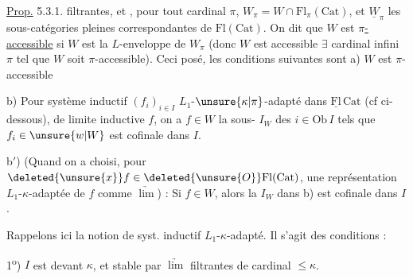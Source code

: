 \uline{Prop.} 5.3.1.   filtrantes, et , pour  tout cardinal  $\pi$,
$W_\pi=W\cap\mathrm{Fl}_{\pi}(\mathrm{Cat})$, et  $\underline W_\pi$ les sous-catégories  pleines correspondantes de $\mathrm{Fl}(\mathrm{Cat})$. On dit que $W$ est \uline{$\pi$-accessible} si $W$ est la $L$-enveloppe de $W_\pi$ (donc $W$ est accessible  $\exists$ cardinal infini $\pi$ tel que $W$ soit $\pi$-accessible). Ceci posé, les conditions suivantes sont 
a) $W$ est  $\pi$-accessible

b) Pour  système inductif $(f_i)_{i\in I}$
$L_1$-$\unsure{\kappa|\pi}$-adapté dans $\underline{\mathrm{Fl}}\,\mathrm{Cat}$ (cf ci-dessous), de limite inductive $f$, on a $f\in W$  la sous- $I_W$ des $i\in\mathrm{Ob}\,I$ tels que $f_i\in \unsure{w|W}$ est cofinale dans $I$.

b$'$) (Quand on a choisi, pour  $\deleted{\unsure{x}}f\in\deleted{\unsure{O}}\mathrm{Fl}(\mathrm{Cat})$, une représentation $L_1$-$\kappa$-adaptée de $f$ comme $\underrightarrow{\lim}$) : Si $f\in W$, alors la  $I_W$  dans b) est cofinale dans $I$.

Rappelons ici la notion de syst. inductif $L_1$-$\kappa$-adapté. Il s'agit des conditions :

1\textsuperscript{o}) $I$ est  devant $\kappa$, et stable par $\underrightarrow{\lim}$ filtrantes de cardinal $\leq\kappa$.

